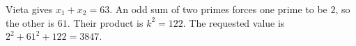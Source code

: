 Vieta gives $x_1+x_2=63$. An odd sum of two primes forces one prime to be $2$, so the other is $61$. Their product is $k^2=122$. The requested value is $2^2+61^2+122=\boxed{3847}$.

